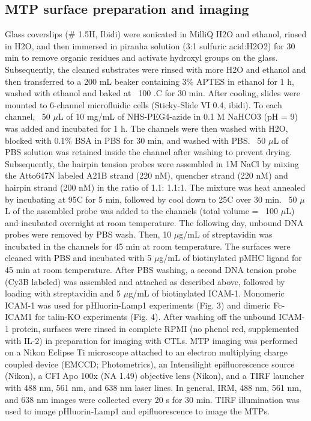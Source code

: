 \subsection{MTP surface preparation and imaging}
Glass coverslips (\# 1.5H, Ibidi) were sonicated in MilliQ H2O and ethanol, rinsed in H2O, and then immersed in piranha solution (3:1 sulfuric acid:H2O2) for 30 min to remove organic residues and activate hydroxyl groups on the glass. Subsequently, the cleaned substrates were rinsed with more H2O and ethanol and then transferred to a 200 mL beaker containing 3\% APTES in ethanol for 1 h, washed with ethanol and baked at ~100 .C for 30 min. After cooling, slides were mounted to 6-channel microfluidic cells (Sticky-Slide VI 0.4, ibidi). To each channel, ~50 $\mu$L of 10 mg/mL of NHS-PEG4-azide in 0.1 M NaHCO3 (pH = 9) was added and incubated for 1 h. The channels were then washed with H2O, blocked with 0.1\% BSA in PBS for 30 min, and washed with PBS. ~50 $\mu$L of PBS solution was retained inside the channel after washing to prevent drying. Subsequently, the hairpin tension probes were assembled in 1M NaCl by mixing the Atto647N labeled A21B strand (220 nM), quencher strand (220 nM) and hairpin strand (200 nM) in the ratio of 1.1: 1.1:1. The mixture was heat annealed by incubating at 95\degree C for 5 min, followed by cool down to 25\degree C over 30 min. ~50 $\mu$L of the assembled probe was added to the channels (total volume = ~100 $\mu$L) and incubated overnight at room temperature. The following day, unbound DNA probes were removed by PBS wash. Then, 10 $\mu$g/mL of streptavidin was incubated in the channels for 45 min at room temperature. The surfaces were cleaned with PBS and incubated with 5 $\mu$g/mL of biotinylated pMHC ligand for 45 min at room temperature. After PBS washing, a second DNA tension probe (Cy3B labeled) was assembled and attached as described above, followed by loading with streptavidin and 5 $\mu$g/mL of biotinylated ICAM-1. Monomeric ICAM-1 was used for pHluorin-Lamp1 experiments (Fig. 3) and dimeric Fc-ICAM1 for talin-KO experiments (Fig. 4). After washing off the unbound ICAM-1 protein, surfaces were rinsed in complete RPMI (no phenol red, supplemented with IL-2) in preparation for imaging with CTLs. MTP imaging was performed on a Nikon Eclipse Ti microscope attached to an electron multiplying charge coupled device (EMCCD; Photometrics), an Intensilight epifluorescence source (Nikon), a CFI Apo 100x (NA 1.49) objective lens (Nikon), and a TIRF launcher with 488 nm, 561 nm, and 638 nm laser lines. In general, IRM, 488 nm, 561 nm, and 638 nm images were collected every 20 s for 30 min. TIRF illumination was used to image pHluorin-Lamp1 and epifluorescence to image the MTPs.

